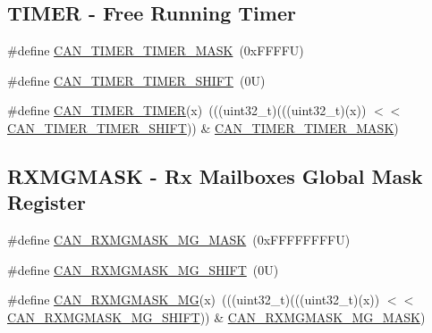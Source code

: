 \subsection*{T\+I\+M\+ER -\/ Free Running Timer}
\begin{DoxyCompactItemize}
\item 
\#define \mbox{\hyperlink{group___c_a_n___register___masks_gaa7323a19c6c05a13fdf8489331e9671f}{C\+A\+N\+\_\+\+T\+I\+M\+E\+R\+\_\+\+T\+I\+M\+E\+R\+\_\+\+M\+A\+SK}}~(0x\+F\+F\+F\+F\+U)
\item 
\#define \mbox{\hyperlink{group___c_a_n___register___masks_gac979f0c3637eddae258cc50c0e9bb9cf}{C\+A\+N\+\_\+\+T\+I\+M\+E\+R\+\_\+\+T\+I\+M\+E\+R\+\_\+\+S\+H\+I\+FT}}~(0\+U)
\item 
\#define \mbox{\hyperlink{group___c_a_n___register___masks_gaf7cbb5a3d2da0895f9e873b71d8c29e8}{C\+A\+N\+\_\+\+T\+I\+M\+E\+R\+\_\+\+T\+I\+M\+ER}}(x)~(((uint32\+\_\+t)(((uint32\+\_\+t)(x)) $<$$<$ \mbox{\hyperlink{group___c_a_n___register___masks_gac979f0c3637eddae258cc50c0e9bb9cf}{C\+A\+N\+\_\+\+T\+I\+M\+E\+R\+\_\+\+T\+I\+M\+E\+R\+\_\+\+S\+H\+I\+FT}})) \& \mbox{\hyperlink{group___c_a_n___register___masks_gaa7323a19c6c05a13fdf8489331e9671f}{C\+A\+N\+\_\+\+T\+I\+M\+E\+R\+\_\+\+T\+I\+M\+E\+R\+\_\+\+M\+A\+SK}})
\end{DoxyCompactItemize}
\subsection*{R\+X\+M\+G\+M\+A\+SK -\/ Rx Mailboxes Global Mask Register}
\begin{DoxyCompactItemize}
\item 
\#define \mbox{\hyperlink{group___c_a_n___register___masks_ga2d7a5f68a7047b3c535a554cc113ef4b}{C\+A\+N\+\_\+\+R\+X\+M\+G\+M\+A\+S\+K\+\_\+\+M\+G\+\_\+\+M\+A\+SK}}~(0x\+F\+F\+F\+F\+F\+F\+F\+F\+U)
\item 
\#define \mbox{\hyperlink{group___c_a_n___register___masks_ga1ace67c70d9f25a27ca39ce78cb0034d}{C\+A\+N\+\_\+\+R\+X\+M\+G\+M\+A\+S\+K\+\_\+\+M\+G\+\_\+\+S\+H\+I\+FT}}~(0\+U)
\item 
\#define \mbox{\hyperlink{group___c_a_n___register___masks_ga2b21343a7f07965355955eaec76021dc}{C\+A\+N\+\_\+\+R\+X\+M\+G\+M\+A\+S\+K\+\_\+\+MG}}(x)~(((uint32\+\_\+t)(((uint32\+\_\+t)(x)) $<$$<$ \mbox{\hyperlink{group___c_a_n___register___masks_ga1ace67c70d9f25a27ca39ce78cb0034d}{C\+A\+N\+\_\+\+R\+X\+M\+G\+M\+A\+S\+K\+\_\+\+M\+G\+\_\+\+S\+H\+I\+FT}})) \& \mbox{\hyperlink{group___c_a_n___register___masks_ga2d7a5f68a7047b3c535a554cc113ef4b}{C\+A\+N\+\_\+\+R\+X\+M\+G\+M\+A\+S\+K\+\_\+\+M\+G\+\_\+\+M\+A\+SK}})
\end{DoxyCompactItemize}
